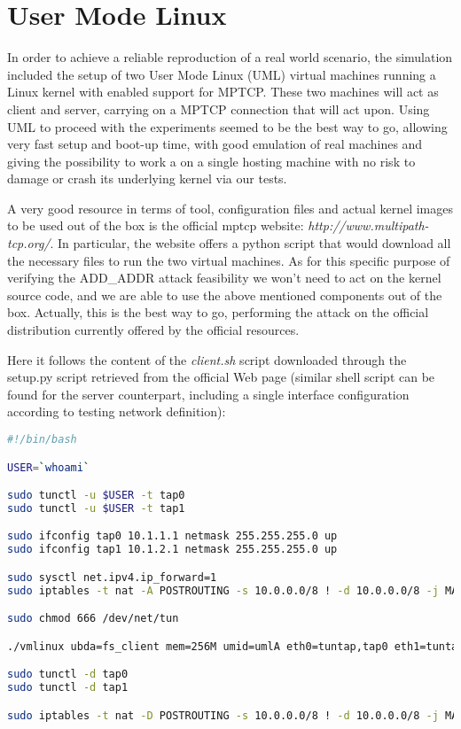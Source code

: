 \section{User Mode Linux}
In order to achieve a reliable reproduction of a real world scenario, the simulation included the setup of two User Mode Linux (UML) virtual machines running a Linux kernel with enabled support for MPTCP. These two machines will act as client and server, carrying on a MPTCP connection that will act upon. 
Using UML to proceed with the experiments seemed to be the best way to go, allowing very fast setup and boot-up time, with good emulation of real machines and giving the possibility to work a on a single hosting machine with no risk to damage or crash its underlying kernel via our tests.

A very good resource in terms of tool, configuration files and actual kernel images to be used out of the box is the official mptcp website:
\textit{http://www.multipath-tcp.org/}. In particular, the website offers a python script that would download all the necessary files to run the two virtual machines. As for this specific purpose of verifying the ADD\_ADDR attack feasibility we won't need to act on the kernel source code, and we are able to use the above mentioned components out of the box. Actually, this is the best way to go, performing the attack on the official distribution currently offered by the official resources.


Here it follows the content of the \textit{client.sh} script downloaded through the setup.py script retrieved from the official Web page (similar shell script can be found for the server counterpart, including a single interface configuration according to testing network definition):


\begin{lstlisting}[language=bash, caption=\textit{client.sh}]
#!/bin/bash

USER=`whoami`

sudo tunctl -u $USER -t tap0
sudo tunctl -u $USER -t tap1

sudo ifconfig tap0 10.1.1.1 netmask 255.255.255.0 up
sudo ifconfig tap1 10.1.2.1 netmask 255.255.255.0 up

sudo sysctl net.ipv4.ip_forward=1
sudo iptables -t nat -A POSTROUTING -s 10.0.0.0/8 ! -d 10.0.0.0/8 -j MASQUERADE

sudo chmod 666 /dev/net/tun

./vmlinux ubda=fs_client mem=256M umid=umlA eth0=tuntap,tap0 eth1=tuntap,tap1

sudo tunctl -d tap0
sudo tunctl -d tap1

sudo iptables -t nat -D POSTROUTING -s 10.0.0.0/8 ! -d 10.0.0.0/8 -j MASQUERADE
\end{lstlisting}


